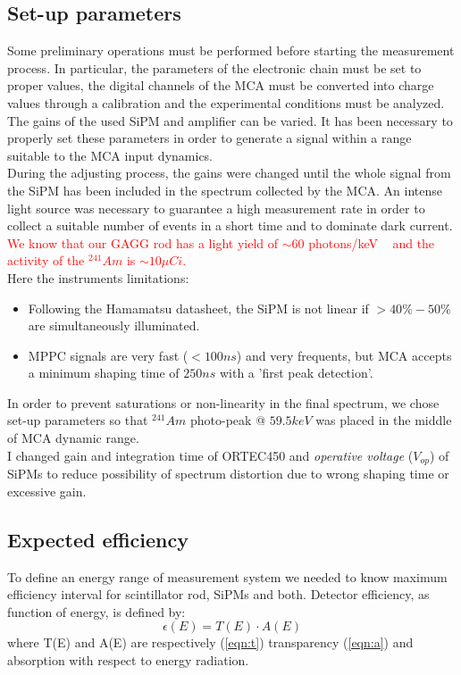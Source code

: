 \documentclass[10pt,a4paper, openany]{book}
\begin{document}
\subsection{Set-up parameters}
Some preliminary operations must be performed before starting the measurement process. In particular, the parameters of the electronic chain must be set to proper values, the digital channels of the MCA must be converted into charge values through a calibration and the experimental conditions must be analyzed.\\[2ex]
The gains of the used SiPM and amplifier can be varied. It has been necessary to properly set these parameters in order to generate a signal within a range suitable to the MCA input dynamics.\\
During the adjusting process, the gains were changed until the whole signal from the SiPM has been included in the spectrum collected by the MCA. An intense light source was necessary to guarantee a high measurement rate in order to collect a suitable number of events in a short time and to dominate dark current.\\
\textcolor{red}{We know that our GAGG rod has a light yield of $\sim 60$ photons/keV ~\cite{gagg:1} and the activity of the $^{241}Am$ is $\sim 10\mu Ci$.}\\[2ex]
Here the instruments limitations:
\begin{itemize}
\item Following the Hamamatsu datasheet, the SiPM is not linear if $> 40 \% - 50\%$ are simultaneously illuminated.
\item MPPC signals are very fast ($<100ns$) and very frequents, but MCA accepts a minimum shaping time of $250ns$ with a 'first peak detection'.
\end{itemize}
In order to prevent saturations or non-linearity in the final spectrum, we chose set-up parameters so that $^{241}Am$ photo-peak @ $59.5 keV$ was placed in the middle of MCA dynamic range.\\
I changed gain and integration time of ORTEC450 and \emph{operative voltage} ($V_{op}$) of SiPMs to reduce possibility of spectrum distortion due to wrong shaping time or excessive gain.

\subsection{Expected efficiency}
To define an energy range of measurement system we needed to know maximum efficiency interval for scintillator rod, SiPMs and both.
Detector efficiency, as function of energy, is defined by:
\begin{equation}
\epsilon(E) = T(E)\cdot A(E)
\end{equation}
where T(E) and A(E) are respectively (\ref{eqn:t}) transparency (\ref{eqn:a}) and absorption with respect to energy radiation.
\end{document}
